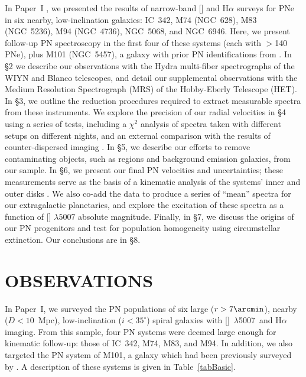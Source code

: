 \documentclass[12pt,preprint]{emulateapj}
\newcommand{\Oline}{[\ion{O}{3}]~$\lambda$5007}
\begin{document}
In Paper~I \citep{thesis1}, we presented the results of narrow-band [] and H$\alpha$ surveys for PNe in six nearby, low-inclination galaxies:  IC~342, M74 (NGC~628), M83 (NGC~5236), M94 (NGC~4736), NGC~5068, and NGC~6946.  Here, we present follow-up PN spectroscopy in the first four of these systems (each with $>$140 PNe), plus M101 (NGC~5457), a galaxy with prior PN identifications from \citet{M101PNe}.  In \S2 we describe our observations with the Hydra multi-fiber spectrographs of the WIYN and Blanco telescopes, and detail our supplemental observations with the Medium Resolution Spectrograph (MRS) of the Hobby-Eberly Telescope (HET)\footnotemark[4].  In \S3, we outline the reduction procedures required to extract measurable spectra from these instruments.  We explore the precision of our radial velocities in \S4 using a series of tests, including a $\chi^2$ analysis of spectra taken with different setups on different nights, and an external comparison with the results of counter-dispersed imaging \citep{M94PNS}. In \S5, we describe our efforts to remove contaminating objects, such as  regions and background emission galaxies, from our sample.  In \S6, we present our final PN velocities and uncertainties; these measurements serve as the basis of a kinematic analysis of the systems' inner and outer disks \citep[][(Paper~III)]{letter,thesis3}.  We also co-add the data to produce a series of ``mean'' spectra for our extragalactic planetaries, and explore the excitation of these spectra as a function of [] $\lambda 5007$ absolute magnitude.  Finally, in \S7, we discuss the origins of our PN progenitors and test for population homogeneity using circumstellar extinction.  Our conclusions are in \S8.

\section{OBSERVATIONS}
In Paper~I, we surveyed the PN populations of six large ($r > 7\arcmin$), nearby ($D < 10$~Mpc), low-inclination ($i < 35^\circ$) spiral galaxies with \Oline\ and H$\alpha$ imaging.  From this sample, four PN systems were deemed large enough for kinematic follow-up:  those of IC~342, M74, M83, and M94.  In addition, we also targeted the PN system of M101, a galaxy which had been previously surveyed by \citet{M101PNe}.   A description of these systems is given in Table~\ref{tabBasic}.
\end{document}
